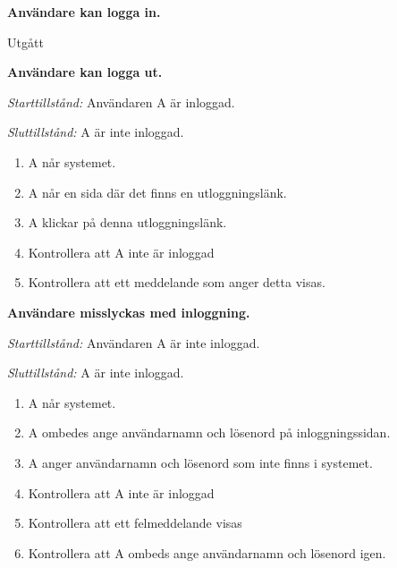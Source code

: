 \documentclass[a4paper]{article}
\begin{document}
\begin{ST}
%
\item
\textbf{Användare kan logga in.}

Utgått
%
%
%

\item
\textbf{Användare kan logga ut.}

\emph{Starttillstånd:} Användaren A är inloggad.

\emph{Sluttillstånd:} A är inte inloggad.

\begin{enumerate}
\item A når systemet.
\item A når en sida där det finns en utloggningslänk.
\item A klickar på denna utloggningslänk.
\item Kontrollera att A inte är inloggad
\item Kontrollera att ett meddelande som anger detta visas.
\end{enumerate}

\item
\textbf{Användare misslyckas med inloggning.}

\emph{Starttillstånd:} Användaren A är inte inloggad.

\emph{Sluttillstånd:} A är inte inloggad.

\begin{enumerate}
\item A når systemet.
\item A ombedes ange användarnamn och lösenord på inloggningssidan.
\item A anger användarnamn och lösenord som inte finns i systemet.
\item Kontrollera att A inte är inloggad
\item Kontrollera att ett felmeddelande visas
\item Kontrollera att A ombeds ange användarnamn och lösenord igen.
\end{enumerate}

\end{ST}
\end{document}
